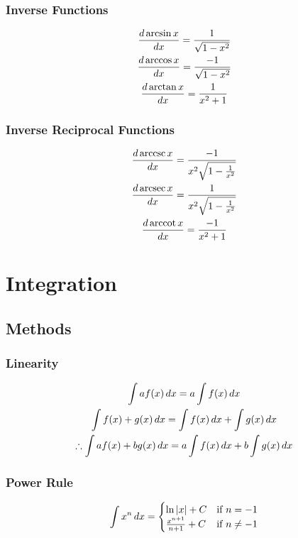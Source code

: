 \documentclass[12pt]{article}
\numberwithin{equation}{subsubsection}
\begin{document}
			\subsubsection{Inverse Functions}
				\begin{gather}
					\frac{d \arcsin x}{d x} = \frac{1}{\sqrt{1 -
					x^2}} \\
					\frac{d \arccos x}{d x} = \frac{-1}{\sqrt{1 -
					x^2}}  \\
					\frac{d \arctan x}{d x} = \frac{1}{x^2 + 1}
				\end{gather}
			\subsubsection{Inverse Reciprocal Functions}
				\begin{gather}
					\frac{d \,\text{arccsc}\, x}{d x} = \frac{-1}{x^2\sqrt{1
					- \frac{1}{x^2}}} \\
					\frac{d \,\text{arcsec}\, x}{d x} = \frac{1}{x^2\sqrt{1
					- \frac{1}{x^2}}} \\
					\frac{d \,\text{arccot}\, x}{d x} = \frac{-1}{x^2 + 1}
				\end{gather}
	\section{Integration}
		\subsection{Methods}
			\subsubsection{Linearity}
				\begin{gather}
					\int af(x)\,d x = a\int f(x)\,d x \\
					\int f(x) + g(x)\,d x = \int f(x)\,d x +
					\int g(x)\,d x \\
					\therefore \int af(x) + bg(x)\,d x = a\int f(x)\,d x
					+ b\int g(x)\,d x
				\end{gather}
			\subsubsection{Power Rule}
				\begin{gather}
					\int x^n\,d x =
						\begin{cases}
							\ln |x| + C & \text{if }
							n = -1 \\
							\frac{x^{n+1}}{n+1} + C
							& \text{if } n \neq -1
						\end{cases}
				\end{gather}
\end{document}
